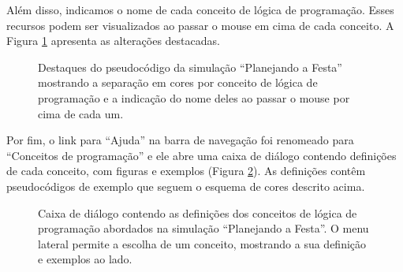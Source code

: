 

\noindent Além disso, indicamos o nome de cada conceito de lógica de programação. Esses recursos podem ser visualizados ao passar o mouse em cima de cada conceito. A Figura \ref{figure:pseudocodigo_destaque} apresenta as alterações destacadas.

\begin{figure}[h!]
    \centering
    \setlength{\fboxrule}{0.1pt} %
    \caption{Destaques do pseudocódigo da simulação \enquote{Planejando a Festa} mostrando a separação em cores por conceito de lógica de programação e a indicação do nome deles ao passar o mouse por cima de cada um.}
    \label{figure:pseudocodigo_destaque}
\end{figure}

Por fim, o link para \enquote{Ajuda} na barra de navegação foi renomeado para \enquote{Conceitos de programação} e ele abre uma caixa de diálogo contendo definições de cada conceito, com figuras e exemplos (Figura \ref{figure:conceitos_programacao}). As definições contêm pseudocódigos de exemplo que seguem o esquema de cores descrito acima.

\begin{figure}[h!]
    \centering
    \setlength{\fboxrule}{0.1pt} %
    \caption{Caixa de diálogo contendo as definições dos conceitos de lógica de programação abordados na simulação \enquote{Planejando a Festa}. O menu lateral permite a escolha de um conceito, mostrando a sua definição e exemplos ao lado.}
    \label{figure:conceitos_programacao}
\end{figure}
